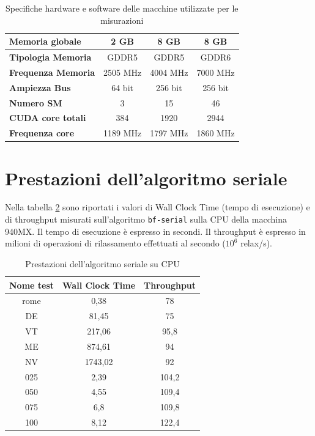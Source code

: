 \documentclass[12pt,a4paper,oneside]{book}
\renewcommand{\arraystretch}{1.1}
\begin{document}
\begin{table}[!ht]
{\begin{tabular}{|l|c|c|c|}
				\textbf{Memoria globale} & 2 GB & 8 GB & 8 GB \\ \hline
				\textbf{Tipologia Memoria} & GDDR5 & GDDR5 & GDDR6 \\ \hline
				\textbf{Frequenza Memoria} & 2505 MHz & 4004 MHz & 7000 MHz \\ \hline
				\textbf{Ampiezza Bus} & 64 bit & 256 bit & 256 bit \\ \hline
				\textbf{Numero SM} & 3 & 15 & 46 \\ \hline
				\textbf{CUDA core totali} & 384 & 1920 & 2944 \\ \hline
				\textbf{Frequenza core} & 1189 MHz & 1797 MHz & 1860 MHz \\ \hline
			\end{tabular}
		}
		\caption{Specifiche hardware e software delle macchine utilizzate per le misurazioni}
		\label{tab:specs}
	\end{table}
	\renewcommand{\arraystretch}{1.1}

	\section{Prestazioni dell'algoritmo seriale}
	Nella tabella \ref{tab:performance_serial} sono riportati i valori di Wall Clock Time (tempo di esecuzione) e di throughput misurati sull'algoritmo \texttt{bf-serial} sulla CPU della macchina 940MX. Il tempo di esecuzione è espresso in secondi. Il throughput è espresso in milioni di operazioni di rilassamento effettuati al secondo ($10^6$ relax/s).
	
	\begin{table}[!ht]
		\centering
		\begin{tabular}{|c|c|c|}
			\hline
			\textbf{Nome test} & \textbf{Wall Clock Time} & \textbf{Throughput} \\ \hline
			       rome        &           0,38           &         78          \\ \hline
			        DE         &          81,45           &         75          \\ \hline
			        VT         &          217,06          &        95,8         \\ \hline
			        ME         &          874,61          &         94          \\ \hline
			        NV         &         1743,02          &         92          \\ \hline
			       025         &           2,39           &        104,2        \\ \hline
			       050         &           4,55           &        109,4        \\ \hline
			       075         &           6,8            &        109,8        \\ \hline
			       100         &           8,12           &        122,4        \\ \hline
		\end{tabular}
		\caption{Prestazioni dell'algoritmo seriale su CPU}
		\label{tab:performance_serial}
	\end{table}
\end{document}
